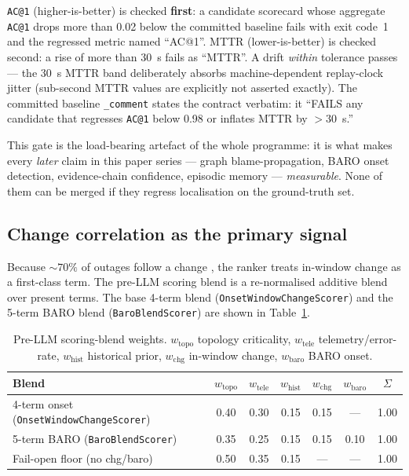 \documentclass[11pt]{article}
\makeatletter
\newcommand{\acone}{\texttt{AC@1}}
\newcommand{\code}[1]{\texttt{#1}}
\makeatother
\begin{document}
\acone{} (higher-is-better) is checked \textbf{first}: a candidate scorecard whose aggregate
\acone{} drops more than 0.02 below the committed baseline fails with exit code~1 and the
regressed metric named ``AC@1''. MTTR (lower-is-better) is checked second: a rise of more
than 30~s fails as ``MTTR''. A drift \emph{within} tolerance passes --- the 30~s MTTR band
deliberately absorbs machine-dependent replay-clock jitter (sub-second MTTR values are
explicitly not asserted exactly). The committed baseline \code{\_comment} states the
contract verbatim: it ``FAILS any candidate that regresses \acone{} below 0.98 or inflates
MTTR by $>30$~s.''

This gate is the load-bearing artefact of the whole programme: it is what makes every
\emph{later} claim in this paper series --- graph blame-propagation, BARO onset detection,
evidence-chain confidence, episodic memory --- \emph{measurable}. None of them can be merged
if they regress localisation on the ground-truth set.

\subsection{Change correlation as the primary signal}
\label{sec:change}

Because ${\sim}70\%$ of outages follow a change \citep{beyer2016sre}, the ranker treats
in-window change as a first-class term. The pre-LLM scoring blend is a re-normalised
additive blend over present terms. The base 4-term blend (\code{OnsetWindowChangeScorer})
and the 5-term BARO blend (\code{BaroBlendScorer}) are shown in Table~\ref{tab:blend}.

\begin{table}[h]
\centering
\caption{Pre-LLM scoring-blend weights. $w_{\text{topo}}$ topology criticality,
$w_{\text{tele}}$ telemetry/error-rate, $w_{\text{hist}}$ historical prior,
$w_{\text{chg}}$ in-window change, $w_{\text{baro}}$ BARO onset.}
\label{tab:blend}
\begin{tabular}{lcccccc}
\toprule
Blend & $w_{\text{topo}}$ & $w_{\text{tele}}$ & $w_{\text{hist}}$ & $w_{\text{chg}}$ & $w_{\text{baro}}$ & $\Sigma$ \\
\midrule
4-term onset (\code{OnsetWindowChangeScorer}) & 0.40 & 0.30 & 0.15 & 0.15 & --- & 1.00 \\
5-term BARO (\code{BaroBlendScorer})          & 0.35 & 0.25 & 0.15 & 0.15 & 0.10 & 1.00 \\
Fail-open floor (no chg/baro)                 & 0.50 & 0.35 & 0.15 & --- & --- & 1.00 \\
\bottomrule
\end{tabular}
\end{table}
\end{document}
